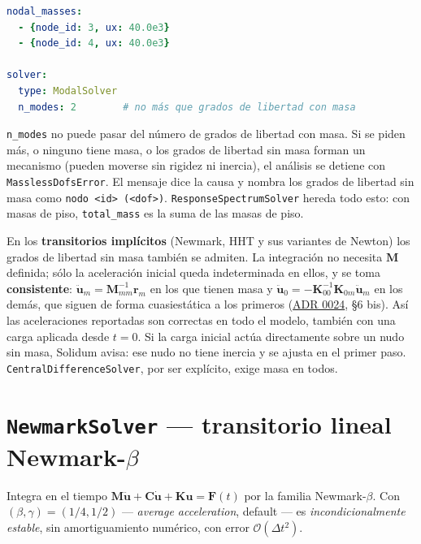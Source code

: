 \documentclass[11pt,oneside]{report}
\begin{document}
\begin{lstlisting}[language=yaml]
nodal_masses:
  - {node_id: 3, ux: 40.0e3}
  - {node_id: 4, ux: 40.0e3}

solver:
  type: ModalSolver
  n_modes: 2        # no más que grados de libertad con masa

\end{lstlisting}

\texttt{n\_modes} no puede pasar del número de grados de libertad con masa. Si se piden más, o ninguno tiene masa, o los grados de libertad sin masa forman un mecanismo (pueden moverse sin rigidez ni inercia), el análisis se detiene con \texttt{MasslessDofsError}. El mensaje dice la causa y nombra los grados de libertad sin masa como \texttt{nodo \textless{}id\textgreater{} (\textless{}dof\textgreater{})}. \texttt{ResponseSpectrumSolver} hereda todo esto: con masas de piso, \texttt{total\_mass} es la suma de las masas de piso.

En los \textbf{transitorios implícitos} (Newmark, HHT y sus variantes de Newton) los grados de libertad sin masa también se admiten. La integración no necesita $\mathbf M$ definida; sólo la aceleración inicial queda indeterminada en ellos, y se toma \textbf{consistente}: $\ddot{\mathbf u}_m = \mathbf M_{mm}^{-1}\mathbf r_m$ en los que tienen masa y $\ddot{\mathbf u}_0 = -\mathbf K_{00}^{-1}\mathbf K_{0m}\ddot{\mathbf u}_m$ en los demás, que siguen de forma cuasiestática a los primeros (\href{https://github.com/jretamav/solidum-fem/blob/main/docs/adr/0024-masas-de-nudo-y-modal-con-dof-sin-masa.md}{ADR 0024}, §6 bis). Así las aceleraciones reportadas son correctas en todo el modelo, también con una carga aplicada desde $t = 0$. Si la carga inicial actúa directamente sobre un nudo sin masa, Solidum avisa: ese nudo no tiene inercia y se ajusta en el primer paso. \texttt{CentralDifferenceSolver}, por ser explícito, exige masa en todos.

\section{\texttt{NewmarkSolver} --- transitorio lineal Newmark-$\beta$}

Integra en el tiempo $\mathbf M\ddot{\mathbf u} + \mathbf C\dot{\mathbf u} + \mathbf K\mathbf u = \mathbf F(t)$ por la familia Newmark-$\beta$. Con $(\beta, \gamma) = (1/4, 1/2)$ --- \textit{average acceleration}, default --- es \textit{incondicionalmente estable}, sin amortiguamiento numérico, con error $\mathcal O(\Delta t^2)$.
\end{document}
